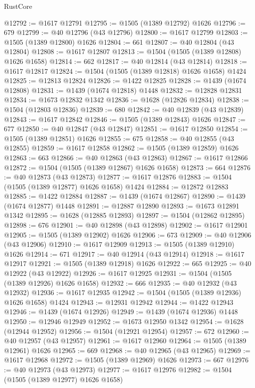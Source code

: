 \begin{lexlean}{RustCore}
\begin{coremodule}
@12792 := @1617 @12791
@12795 := @1505 (@1389 @12792) @1626
@12796 := 679
@12799 := @40 @12796 (@43 @12796)
@12800 := @1617 @12799
@12803 := @1505 (@1389 @12800) @1626
@12804 := 661
@12807 := @40 @12804 (@43 @12804)
@12808 := @1617 @12807
@12813 := @1504 (@1505 (@1389 @12808) @1626 @1658)
@12814 := 662
@12817 := @40 @12814 (@43 @12814)
@12818 := @1617 @12817
@12824 := @1504 (@1505 (@1389 @12818) @1626 @1658) @1424
@12825 := @12813 @12824
@12826 := @1422 @12825
@12828 := @1439 (@1674 @12808)
@12831 := @1439 (@1674 @12818) @1448
@12832 := @12828 @12831
@12834 := @1673 @12832 @1342
@12836 := @1628 (@12826 @12834)
@12838 := @1504 (@12803 @12836)
@12839 := 680
@12842 := @40 @12839 (@43 @12839)
@12843 := @1617 @12842
@12846 := @1505 (@1389 @12843) @1626
@12847 := 677
@12850 := @40 @12847 (@43 @12847)
@12851 := @1617 @12850
@12854 := @1505 (@1389 @12851) @1626
@12855 := 675
@12858 := @40 @12855 (@43 @12855)
@12859 := @1617 @12858
@12862 := @1505 (@1389 @12859) @1626
@12863 := 663
@12866 := @40 @12863 (@43 @12863)
@12867 := @1617 @12866
@12872 := @1504 (@1505 (@1389 @12867) @1626 @1658)
@12873 := 664
@12876 := @40 @12873 (@43 @12873)
@12877 := @1617 @12876
@12883 := @1504 (@1505 (@1389 @12877) @1626 @1658) @1424
@12884 := @12872 @12883
@12885 := @1422 @12884
@12887 := @1439 (@1674 @12867)
@12890 := @1439 (@1674 @12877) @1448
@12891 := @12887 @12890
@12893 := @1673 @12891 @1342
@12895 := @1628 (@12885 @12893)
@12897 := @1504 (@12862 @12895)
@12898 := 676
@12901 := @40 @12898 (@43 @12898)
@12902 := @1617 @12901
@12905 := @1505 (@1389 @12902) @1626
@12906 := 673
@12909 := @40 @12906 (@43 @12906)
@12910 := @1617 @12909
@12913 := @1505 (@1389 @12910) @1626
@12914 := 671
@12917 := @40 @12914 (@43 @12914)
@12918 := @1617 @12917
@12921 := @1505 (@1389 @12918) @1626
@12922 := 665
@12925 := @40 @12922 (@43 @12922)
@12926 := @1617 @12925
@12931 := @1504 (@1505 (@1389 @12926) @1626 @1658)
@12932 := 666
@12935 := @40 @12932 (@43 @12932)
@12936 := @1617 @12935
@12942 := @1504 (@1505 (@1389 @12936) @1626 @1658) @1424
@12943 := @12931 @12942
@12944 := @1422 @12943
@12946 := @1439 (@1674 @12926)
@12949 := @1439 (@1674 @12936) @1448
@12950 := @12946 @12949
@12952 := @1673 @12950 @1342
@12954 := @1628 (@12944 @12952)
@12956 := @1504 (@12921 @12954)
@12957 := 672
@12960 := @40 @12957 (@43 @12957)
@12961 := @1617 @12960
@12964 := @1505 (@1389 @12961) @1626
@12965 := 669
@12968 := @40 @12965 (@43 @12965)
@12969 := @1617 @12968
@12972 := @1505 (@1389 @12969) @1626
@12973 := 667
@12976 := @40 @12973 (@43 @12973)
@12977 := @1617 @12976
@12982 := @1504 (@1505 (@1389 @12977) @1626 @1658)

\end{coremodule}
\end{lexlean}

